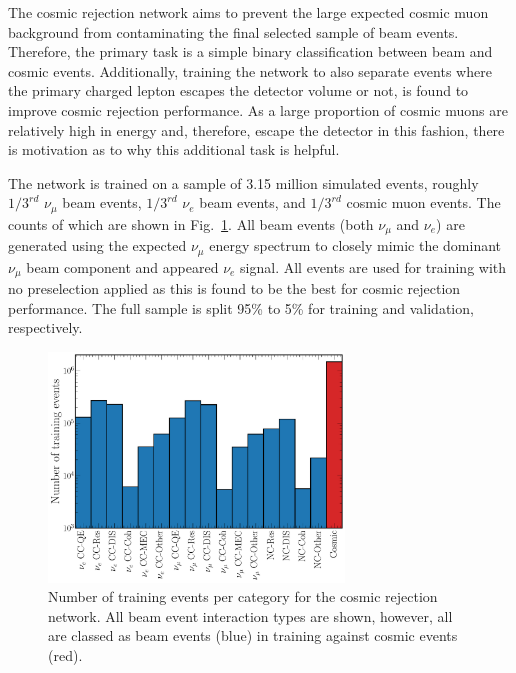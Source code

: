The cosmic rejection network aims to prevent the large expected cosmic muon background from
contaminating the final selected sample of beam events. Therefore, the primary task is a simple
binary classification between beam and cosmic events. Additionally, training the network to also
separate events where the primary charged lepton escapes the detector volume or not, is found to
improve cosmic rejection performance. As a large proportion of cosmic muons are relatively high in
energy and, therefore, escape the detector in this fashion, there is motivation as to why this
additional task is helpful.

The network is trained on a sample of 3.15 million simulated events, roughly $1/3^{rd}$
$\nu_{\mu}$ beam events, $1/3^{rd}$ $\nu_{e}$ beam events, and $1/3^{rd}$ cosmic muon events. The
counts of which are shown in Fig.~\ref{fig:cosmic_training_sample}. All beam events (both
$\nu_{\mu}$ and $\nu_{e}$) are generated using the expected \chips $\nu_{\mu}$ energy spectrum to
closely mimic the dominant $\nu_{\mu}$ beam component and appeared $\nu_{e}$ signal. All events
are used for training with no preselection applied as this is found to be the best for cosmic
rejection performance. The full sample is split 95\% to 5\% for training and validation,
respectively.

\begin{figure} %
    \includegraphics[width=0.7\textwidth]{diagrams/6-cvn/chipsnet/explore_cosmic_training_sample.pdf}
    \caption[Number of training events per category for the cosmic rejection network.]
    {Number of training events per category for the cosmic rejection network. All beam event
        interaction types are shown, however, all are classed as beam events (blue) in training
        against cosmic events (red).}
    \label{fig:cosmic_training_sample}
\end{figure}

